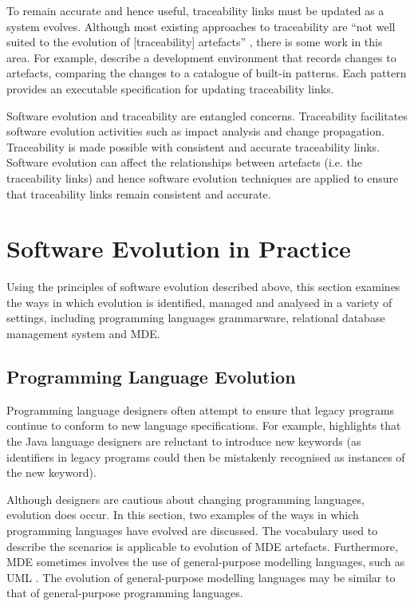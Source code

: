 To remain accurate and hence useful, traceability links must be updated as a system evolves. Although most existing approaches to traceability are ``not well suited to the evolution of [traceability] artefacts'' \cite[pg. 24]{winkler09survey}, there is some work in this area. For example, \cite{mader08rule} describe a development environment that records changes to artefacts, comparing the changes to a catalogue of built-in patterns. Each pattern provides an executable specification for updating traceability links.

Software evolution and traceability are entangled concerns. Traceability facilitates software evolution activities such as impact analysis and change propagation. Traceability is made possible with consistent and accurate traceability links. Software evolution can affect the relationships between artefacts (i.e. the traceability links) and hence software evolution techniques are applied to ensure that traceability links remain consistent and accurate.

\section{Software Evolution in Practice}
\label{sec:software_evolution_practice}
Using the principles of software evolution described above, this section examines the ways in which evolution is identified, managed and analysed in a variety of settings, including programming languages grammarware, relational database management system and MDE. 

\subsection{Programming Language Evolution}
Programming language designers often attempt to ensure that legacy programs continue to conform to new language specifications. For example, \cite{cervelle06tatoo} highlights that the Java \cite{java} language designers are reluctant to introduce new keywords (as identifiers in legacy programs could then be mistakenly recognised as instances of the new keyword).

Although designers are cautious about changing programming languages, evolution does occur. In this section, two examples of the ways in which programming languages have evolved are discussed. The vocabulary used to describe the scenarios is applicable to evolution of MDE artefacts. Furthermore, MDE sometimes involves the use of general-purpose modelling languages, such as UML \cite{uml212}. The evolution of general-purpose modelling languages may be similar to that of general-purpose programming languages.

